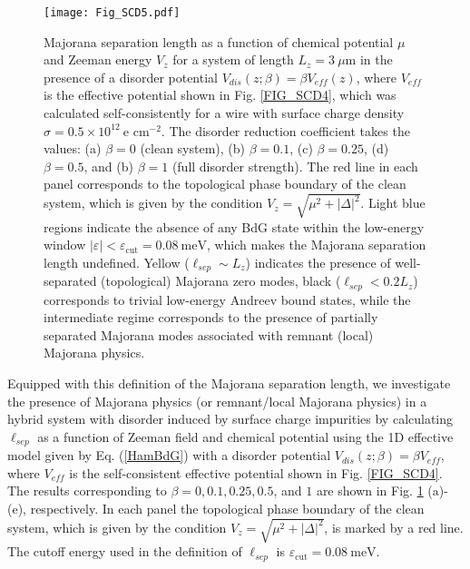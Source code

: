 \documentclass[aps,prmaterials,twocolumn,superscriptaddress,longbibliography]{revtex4-2}
\begin{document}
\begin{figure}[ht]
    \begin{center}
    \texttt{[image: Fig\_SCD5.pdf]}
    \end{center}
    \vspace{-0.5cm}
    \caption{Majorana separation length as a function of chemical potential $\mu$ and Zeeman energy $V_z$ for a system of length $L_z=3~\mu\text{m}$ in the presence of a disorder potential $V_{dis}(z; \beta) = \beta V_{eff}(z)$, where $V_{eff}$ is the effective potential shown in Fig. \ref{FIG_SCD4}, which was calculated self-consistently for a wire with surface charge density $\sigma = 0.5 \times 10^{12}~\text{e cm}^{-2}$. The disorder reduction coefficient takes the values: (a) $\beta=0$ (clean system), (b) $\beta=0.1$, (c) $\beta=0.25$, (d) $\beta=0.5$, and (b) $\beta=1$ (full disorder strength).   
     The red line in each panel corresponds to the topological phase boundary of the clean system, which is given by the condition $V_z = \sqrt{\mu^2 + |\Delta|^2}$. Light blue regions indicate the absence of any BdG state within the  low-energy window $|\varepsilon| < \varepsilon_{\text{cut}} = 0.08~\text{meV}$, which makes the Majorana separation length undefined. Yellow ($\ell_{sep}\sim L_z$) indicates the presence of well-separated (topological) Majorana zero modes, black ($\ell_{sep}<0.2L_z$) corresponds to trivial low-energy Andreev bound states, while the intermediate regime corresponds to the presence of partially separated Majorana modes associated with remnant (local) Majorana physics.}
    \label{FIG_SCD5}
    \vspace{-1mm}
\end{figure}

Equipped with this definition of the Majorana separation  length, we investigate the presence of Majorana physics (or remnant/local Majorana physics) in a hybrid system with disorder induced by surface charge impurities by calculating $\ell_{sep}$ as a function of Zeeman field and chemical potential using the 1D effective model given by Eq. (\ref{HamBdG}) with a disorder potential $V_{dis}(z;\beta) =\beta V_{eff}$, where $V_{eff}$ is the self-consistent effective potential shown in Fig. \ref{FIG_SCD4}. The results corresponding to $\beta=0, 0.1, 0.25, 0.5$, and $1$ are shown in Fig. \ref{FIG_SCD5} (a)-(e), respectively. In each panel the topological phase boundary of the clean system, which is given by the condition $V_z = \sqrt{\mu^2 + |\Delta|^2}$, is marked by a red line. The cutoff energy used in the definition of $\ell_{sep}$ is $\varepsilon_{\text{cut}} = 0.08~\text{meV}$. 
\end{document}
